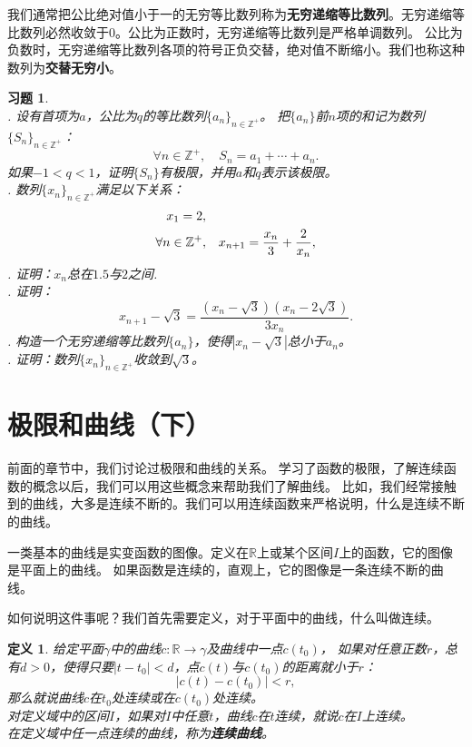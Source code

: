 \documentclass[12pt,UTF8]{ctexbook}
\newtheorem{df}{定义}[section]
\newtheorem{sk}{思考}[section]
\newtheorem{xt}{习题}[section]
\begin{document}
我们通常把公比绝对值小于一的无穷等比数列称为\textbf{无穷递缩等比数列}。无穷递缩等比数列必然收敛于$0$。公比为正数时，无穷递缩等比数列是严格单调数列。
公比为负数时，无穷递缩等比数列各项的符号正负交替，绝对值不断缩小。我们也称这种数列为\textbf{交替无穷小}。

    

\begin{xt}
    \mbox{}\\
    . 设有首项为$a$，公比为$q$的等比数列$\{a_n\}_{n\in\mathbb{Z}^+}$。
    把$\{a_n\}$前$n$项的和记为数列$\{S_n\}_{n\in\mathbb{Z}^+}$：
    $$ \forall n \in \mathbb{Z}^+ , \quad S_n = a_1 + \cdots + a_n. $$
    如果$-1<q<1$，证明$\{S_n\}$有极限，并用$a$和$q$表示该极限。\\
    . 数列$\{x_n\}_{n\in\mathbb{Z}^+}$满足以下关系：
    \begin{align}
        x_1 = 2, & \notag \\
        \forall n\in\mathbb{Z}^+, &\quad x_{n+1} = \frac{x_n}{3} + \frac{2}{x_n},\notag
    \end{align}
    . 证明：$x_n$总在$1.5$与$2$之间.\\
    . 证明：
    $$x_{n+1} - \sqrt{3} = \frac{(x_n - \sqrt{3})(x_n - 2\sqrt{3})}{3x_n}.$$
    . 构造一个无穷递缩等比数列$\{a_n\}$，使得$|x_n - \sqrt{3}|$总小于$a_n$。\\
    . 证明：数列$\{x_n\}_{n\in\mathbb{Z}^+}$收敛到$\sqrt{3}$。
\end{xt}

\section{极限和曲线（下）}
前面的章节中，我们讨论过极限和曲线的关系。
学习了函数的极限，了解连续函数的概念以后，我们可以用这些概念来帮助我们了解曲线。
比如，我们经常接触到的曲线，大多是连续不断的。我们可以用连续函数来严格说明，什么是连续不断的曲线。

一类基本的曲线是实变函数的图像。定义在$\mathbb{R}$上或某个区间$I$上的函数，它的图像是平面上的曲线。
如果函数是连续的，直观上，它的图像是一条连续不断的曲线。

如何说明这件事呢？我们首先需要定义，对于平面中的曲线，什么叫做连续。

\begin{df}
    给定平面$\gamma$中的曲线$c: \mathbb{R} \rightarrow \gamma$及曲线中一点$c(t_0)$，
    如果对任意正数$r$，总有$d>0$，使得只要$|t - t_0| < d$，点$c(t)$与$c(t_0)$的距离就小于$r$：
    $$ |c(t) - c(t_0)| < r,$$
    那么就说曲线$c$在$t_0$处连续或在$c(t_0)$处连续。\\
    对定义域中的区间$I$，如果对$I$中任意$t$，曲线$c$在$t$连续，就说$c$在$I$上连续。\\
    在定义域中任一点连续的曲线，称为\textbf{连续曲线}。
\end{df}
\end{document}
